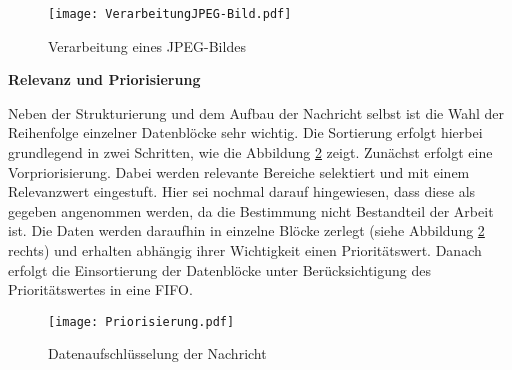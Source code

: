 \begin{figure}[H]
	\centering
	\texttt{[image: VerarbeitungJPEG-Bild.pdf]}
	\caption{Verarbeitung eines JPEG-Bildes}
	\label{fig:beispielJPG}
\end{figure}

\textbf{Relevanz und Priorisierung}

Neben der Strukturierung und dem Aufbau der Nachricht selbst ist die
Wahl der Reihenfolge einzelner Datenblöcke sehr wichtig. Die Sortierung erfolgt
hierbei grundlegend in zwei Schritten, wie die Abbildung \ref{fig:priorisierungen}
zeigt. Zunächst erfolgt eine Vorpriorisierung. Dabei werden relevante Bereiche
selektiert und mit einem Relevanzwert eingestuft. Hier sei nochmal darauf
hingewiesen, dass diese als gegeben angenommen werden, da die Bestimmung nicht
Bestandteil der Arbeit ist. Die Daten werden daraufhin in einzelne Blöcke
zerlegt (siehe Abbildung \ref{fig:priorisierungen} rechts) und erhalten abhängig
ihrer Wichtigkeit einen Prioritätswert. Danach erfolgt die Einsortierung der
Datenblöcke unter Berücksichtigung des Prioritätswertes in eine \gls{FIFO}.

\begin{figure}[H]
	\centering
	\texttt{[image: Priorisierung.pdf]}
	\caption{Datenaufschlüsselung der Nachricht}
	\label{fig:priorisierungen}
\end{figure}
